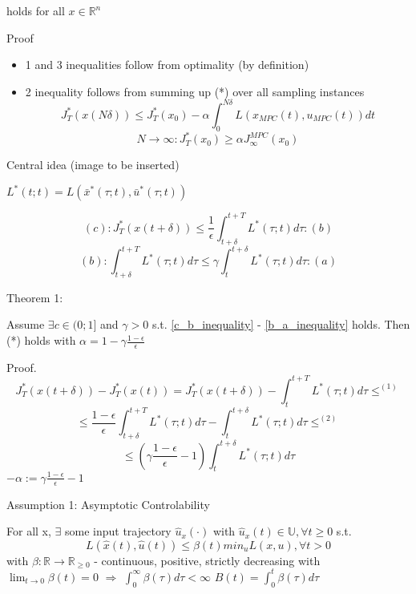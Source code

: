 holds for all $x \in \mathbb{R}^n$

Proof
\begin{itemize}
\item 1 and 3 inequalities follow from optimality (by definition)
\item 2 inequality follows from summing up (*) over all sampling instances
\begin{equation}
J^*_T(x(N\delta)) \leq J_T^*(x_0) - \alpha \int_0^{N\delta}L(x_{MPC}(t), u_{MPC}(t))dt
\end{equation}
\begin{equation}
N \to \infty : J_T^*(x_0) \geq \alpha J_{\infty}^{MPC}(x_0) 
\end{equation}
\end{itemize}

Central idea (image to be inserted)

$L^*(t;t) = L(\bar x^*(\tau;t), \bar u^*(\tau;t))$

\begin{equation}\label{c_b_inequality}
(c): J_T^*(x(t+\delta)) \leq \frac{1}{\epsilon} \int_{t+\delta}^{t+T}L^*(\tau;t)d\tau :(b)
\end{equation}
\begin{equation}\label{b_a_inequality}
(b): \int_{t+\delta}^{t+T}L^*(\tau;t)d\tau \leq \gamma \int_{t}^{t+\delta}L^*(\tau;t)d\tau :(a)
\end{equation} 

Theorem 1:

Assume $\exists c \in (0;1]$ and $\gamma > 0$ s.t. \ref{c_b_inequality} - \ref{b_a_inequality} holds. Then (*) holds with $\alpha =1 - \gamma \frac{1-\epsilon}{\epsilon}$

Proof.
\begin{equation*}
J_T^*(x(t+\delta)) - J_T^*(x(t)) = J_T^*(x(t+\delta)) - \int_{t}^{t+T}L^*(\tau;t)d\tau \leq^{(1)}
\end{equation*}
\begin{equation*}
\leq \frac{1-\epsilon}{\epsilon} \int_{t+\delta}^{t+T}L^*(\tau;t)d\tau - \int_t^{t+\delta}L^*(\tau;t)d\tau \leq^{(2)}
\end{equation*}
\begin{equation*}
\leq (\gamma \frac{1-\epsilon}{\epsilon} - 1) \int_t^{t+\delta}L^*(\tau;t)d\tau
\end{equation*} 
$-\alpha := \gamma \frac{1-\epsilon}{\epsilon} - 1$ 

Assumption 1: Asymptotic Controlability

For all x, $\exists$ some input trajectory $\hat u_x(\cdot)$
with $\hat u_x(t) \in \mathbb{U}, \forall t \geq 0$ s.t.
\begin{equation*}
L(\hat x(t),\hat u(t)) \leq \beta(t) min_u L(x,u), \forall t > 0
\end{equation*}
with $\beta: \mathbb{R} \to \mathbb{R}_{\geq 0}$
 - continuous, positive, strictly decreasing with $\lim_{t \to 0} \beta(t) = 0$ $\Rightarrow$
$\int_0^{\infty}\beta(\tau)d\tau < \infty$
$B(t) = \int_0^t\beta(\tau)d\tau$

